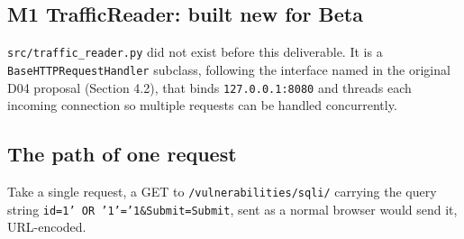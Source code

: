 \documentclass{llncs}
\begin{document}
\subsection{M1 TrafficReader: built new for Beta}
\texttt{src/traffic\_reader.py} did not exist before this deliverable.
It is a \texttt{BaseHTTPRequestHandler} subclass, following the interface
named in the original D04 proposal (Section 4.2), that binds
\texttt{127.0.0.1:8080} and threads each incoming connection so multiple
requests can be handled concurrently.

\subsection{The path of one request}
Take a single request, a GET to \texttt{/vulnerabilities/sqli/} carrying
the query string \texttt{id=1' OR '1'='1\&Submit=Submit}, sent as a
normal browser would send it, URL-encoded.
\end{document}

